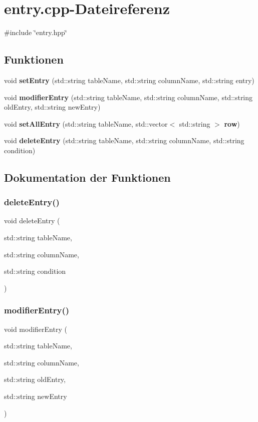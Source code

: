\section{entry.\+cpp-\/\+Dateireferenz}
\label{entry_8cpp}
{\ttfamily \#include \char`\"{}entry.\+hpp\char`\"{}}\newline
\subsection*{Funktionen}
\begin{DoxyCompactItemize}
\item 
void \textbf{ set\+Entry} (std\+::string table\+Name, std\+::string column\+Name, std\+::string entry)
\item 
void \textbf{ modifier\+Entry} (std\+::string table\+Name, std\+::string column\+Name, std\+::string old\+Entry, std\+::string new\+Entry)
\item 
void \textbf{ set\+All\+Entry} (std\+::string table\+Name, std\+::vector$<$ std\+::string $>$ \textbf{ row})
\item 
void \textbf{ delete\+Entry} (std\+::string table\+Name, std\+::string column\+Name, std\+::string condition)
\end{DoxyCompactItemize}


\subsection{Dokumentation der Funktionen}
\mbox{\label{entry_8cpp_a1ea4c59c6377c754fd0264b58f476685}} 
\subsubsection{delete\+Entry()}
{\footnotesize\ttfamily void delete\+Entry (\begin{DoxyParamCaption}\item[{std\+::string}]{table\+Name,  }\item[{std\+::string}]{column\+Name,  }\item[{std\+::string}]{condition }\end{DoxyParamCaption})}

\mbox{\label{entry_8cpp_ab254b5514a4950c7479bc4d513c438dc}} 
\subsubsection{modifier\+Entry()}
{\footnotesize\ttfamily void modifier\+Entry (\begin{DoxyParamCaption}\item[{std\+::string}]{table\+Name,  }\item[{std\+::string}]{column\+Name,  }\item[{std\+::string}]{old\+Entry,  }\item[{std\+::string}]{new\+Entry }\end{DoxyParamCaption})}

